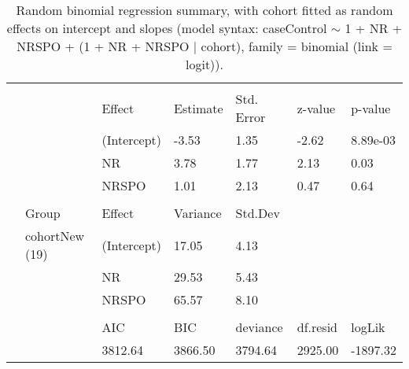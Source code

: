 \begin{table}

\caption{\label{tab:}Random binomial regression summary, with cohort  fitted as random effects on intercept and slopes (model syntax: caseControl $\sim$ 1 + NR + NRSPO + (1 + NR + NRSPO $\mid$ cohort), family = binomial (link = logit)).}
\centering
\begin{tabular}[t]{lllllll}
\toprule
\addlinespace[0.3em]
\multicolumn{7}{l}{\textbf{Fixed effects}}\\
\hspace{1em} &  & Effect & Estimate & Std. Error & z-value & p-value\\
\hspace{1em} &  & (Intercept) & -3.53 & 1.35 & -2.62 & 8.89e-03\\
\hspace{1em} &  & NR & 3.78 & 1.77 & 2.13 & 0.03\\
\hspace{1em} &  & NRSPO & 1.01 & 2.13 & 0.47 & 0.64\\
\addlinespace[0.3em]
\multicolumn{7}{l}{\textbf{Random effects}}\\
\hspace{1em} & Group & Effect & Variance & Std.Dev &  & \\
\hspace{1em} & cohortNew (19) & (Intercept) & 17.05 & 4.13 &  & \\
\hspace{1em} &  & NR & 29.53 & 5.43 &  & \\
\hspace{1em} &  & NRSPO & 65.57 & 8.10 &  & \\
\addlinespace[0.3em]
\multicolumn{7}{l}{\textbf{Model quality}}\\
\hspace{1em} &  & AIC & BIC & deviance & df.resid & logLik\\
 &  & 3812.64 & 3866.50 & 3794.64 & 2925.00 & -1897.32\\
\bottomrule
\end{tabular}
\end{table}
